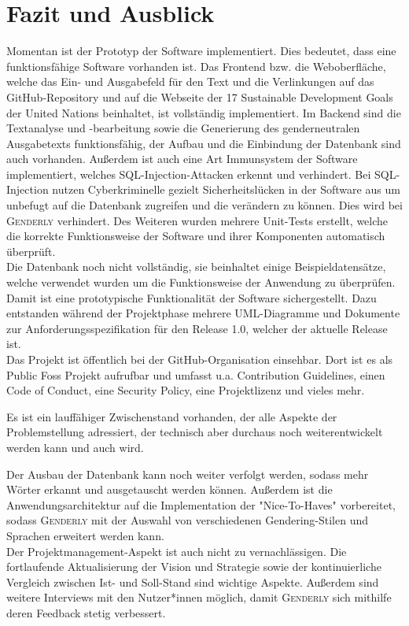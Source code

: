\documentclass[paper=a4, parskip=half]{scrreprt}
\newcommand{\Genderly}{\textsc{Genderly }}
\begin{document}
\chapter{Fazit und Ausblick}
Momentan ist der Prototyp der Software implementiert. Dies bedeutet, dass eine funktionsfähige Software vorhanden ist. Das Frontend bzw. die Weboberfläche, welche das Ein- und Ausgabefeld für den Text und die Verlinkungen auf das GitHub-Repository und auf die Webseite der 17 Sustainable Development Goals der United Nations beinhaltet, ist vollständig implementiert. Im Backend sind die Textanalyse und -bearbeitung sowie die Generierung des genderneutralen Ausgabetexts funktionsfähig, der Aufbau und die Einbindung der Datenbank sind auch vorhanden. Außerdem ist auch eine Art Immunsystem der Software implementiert, welches SQL-Injection-Attacken erkennt und verhindert. Bei SQL-Injection nutzen Cyberkriminelle gezielt Sicherheitslücken in der Software aus um unbefugt auf die Datenbank zugreifen und die verändern zu können. Dies wird bei \Genderly verhindert. Des Weiteren wurden mehrere Unit-Tests erstellt, welche die korrekte Funktionsweise der Software und ihrer Komponenten automatisch überprüft. \\
Die Datenbank noch nicht vollständig, sie beinhaltet einige Beispieldatensätze, welche verwendet wurden um die Funktionsweise der Anwendung zu überprüfen.
Damit ist eine prototypische Funktionalität der Software sichergestellt. Dazu entstanden während der Projektphase mehrere UML-Diagramme und Dokumente zur Anforderungsspezifikation für den Release 1.0, welcher der aktuelle Release ist. \\
Das Projekt ist öffentlich bei der GitHub-Organisation einsehbar. Dort ist es als Public Foss Projekt aufrufbar und umfasst u.a. Contribution Guidelines, einen Code of Conduct, eine Security Policy, eine Projektlizenz und vieles mehr.

Es ist ein lauffähiger Zwischenstand vorhanden, der alle Aspekte der Problemstellung adressiert, der technisch aber durchaus noch weiterentwickelt werden kann und auch wird.

Der Ausbau der Datenbank kann noch weiter verfolgt werden, sodass mehr Wörter erkannt und ausgetauscht werden können. 
Außerdem ist die Anwendungsarchitektur auf die Implementation der "Nice-To-Haves" vorbereitet, sodass \Genderly mit der Auswahl von verschiedenen Gendering-Stilen und Sprachen erweitert werden kann. \\
Der Projektmanagement-Aspekt ist auch nicht zu vernachlässigen. Die fortlaufende Aktualisierung der Vision und Strategie sowie der kontinuierliche Vergleich zwischen Ist- und Soll-Stand sind wichtige Aspekte. Außerdem sind weitere Interviews mit den Nutzer*innen möglich, damit \Genderly sich mithilfe deren Feedback stetig verbessert.
\end{document}
